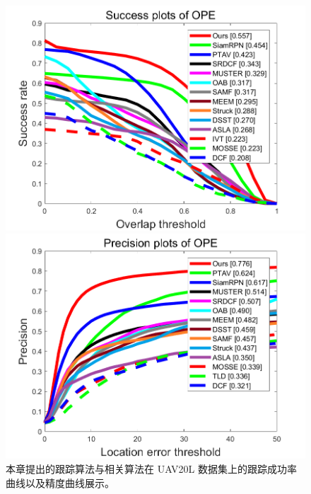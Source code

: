 \begin{figure}[t]
\begin{minipage}{0.48\linewidth}
  \centering
  \centerline{\includegraphics[width=1.0\textwidth]{Img/globally/UAV20L/quality_plot_overlap_OPE_AUC.png}}
\end{minipage}
\hfill
\begin{minipage}{0.48\linewidth}
  \centering
  \centerline{\includegraphics[width=1.0\textwidth]{Img/globally/UAV20L/quality_plot_error_OPE_threshold.png}}
\end{minipage}
\caption{本章提出的跟踪算法与相关算法在 UAV20L \cite{mueller2016benchmark} 数据集上的跟踪成功率曲线以及精度曲线展示。}
\label{fig:globally_uav20l}
\end{figure}

